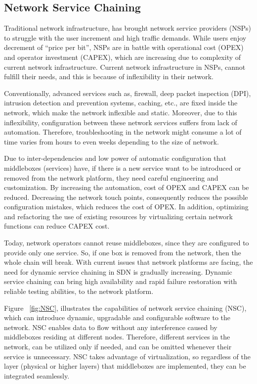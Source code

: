 \documentclass[english]{tktltiki2}
\theoremstyle{definition}
\theoremstyle{remark}
\begin{document}
\subsection{Network Service Chaining}

Traditional network infrastructure, has brought network service providers (NSPs) to struggle with the user increment and high traffic demands. While users enjoy decrement of “price per bit”, NSPs are in battle with operational cost (OPEX) and operator investment (CAPEX), which are increasing due to complexity of current network infrastructure. Current network infrastructure in NSPs, cannot fulfill their needs, and this is because of inflexibility in their network. \cite{Wol13}

Conventionally, advanced services such as, firewall, deep packet inspection (DPI), intrusion detection and prevention systems, caching, etc., are fixed inside the network, which make the network inflexible and static. Moreover, due to this inflexibility, configuration between these network services suffers from lack of automation. Therefore, troubleshooting in the network might consume a lot of time varies from hours to even weeks depending to the size of network. 

Due to inter-dependencies and low power of automatic configuration that middleboxes (services) have, if there is a new service want to be introduced or removed from the network platform, they need careful engineering and customization. By increasing the automation, cost of OPEX and CAPEX can be reduced.  Decreasing the network touch points, consequently reduces the possible configuration mistakes, which reduces the cost of OPEX. In addition, optimizing and refactoring the use of existing resources by virtualizing certain network functions can reduce CAPEX cost. 

Today, network operators cannot reuse middleboxes, since they are configured to provide only one service. So, if one box is removed from the network, then the whole chain will break. With current issues that network platforms are facing,  the need for dynamic service chaining in SDN is gradually increasing. Dynamic service chaining can bring high availability and rapid failure restoration with reliable testing abilities, to the network platform. 

Figure ~\ref{fig:NSC}, illustrates the capabilities of network service chaining (NSC), which can introduce dynamic, upgradable and configurable software to the network. NSC enables data to flow without any interference caused by middleboxes residing at different nodes. Therefore, different services in the network, can be utilized only if needed, and can be omitted whenever their service is unnecessary. NSC takes advantage of virtualization, so regardless of the layer (physical or higher layers) that middleboxes are implemented, they can be integrated seamlessly. 
       
\end{document}
